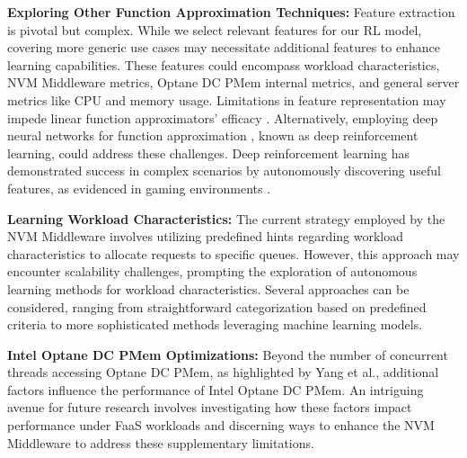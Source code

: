 \textbf{Exploring Other Function Approximation Techniques:} Feature extraction is pivotal but complex. While we select relevant features for our RL model, covering more generic use cases may necessitate additional features to enhance learning capabilities. These features could encompass workload characteristics, NVM Middleware metrics, Optane DC PMem internal metrics, and general server metrics like CPU and memory usage. Limitations in feature representation may impede linear function approximators' efficacy \cite{russel2020ai}. Alternatively, employing deep neural networks for function approximation \cite{Quantit3:online}, known as deep reinforcement learning, could address these challenges. Deep reinforcement learning has demonstrated success in complex scenarios by autonomously discovering useful features, as evidenced in gaming environments \cite{mnih2013playing,silver2017mastering}.

\textbf{Learning Workload Characteristics:} The current strategy employed by the NVM Middleware involves utilizing predefined hints regarding workload characteristics to allocate requests to specific queues. However, this approach may encounter scalability challenges, prompting the exploration of autonomous learning methods for workload characteristics. Several approaches can be considered, ranging from straightforward categorization based on predefined criteria to more sophisticated methods leveraging machine learning models.

\textbf{Intel Optane DC PMem Optimizations:} Beyond the number of concurrent threads accessing Optane DC PMem, as highlighted by Yang et al., additional factors influence the performance of Intel Optane DC PMem. An intriguing avenue for future research involves investigating how these factors impact performance under FaaS workloads and discerning ways to enhance the NVM Middleware to address these supplementary limitations.